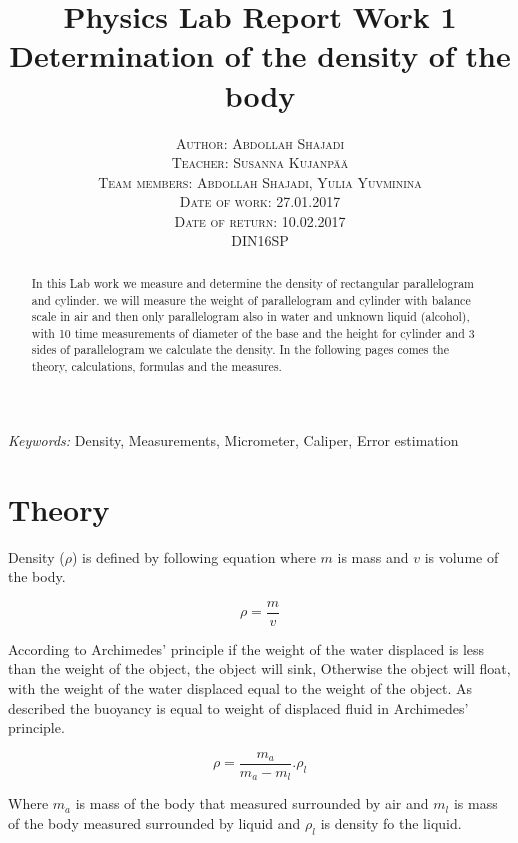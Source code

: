 \documentclass[a4paper, 12pt]{article}
\title{\textbf{Physics Lab Report Work 1}\\
	Determination of the density of the body}
\author{\textsc{Author: Abdollah Shajadi}
	\\{\textsc{Teacher: Susanna Kujanp{\"a}{\"a}}}
	\\{\textsc{Team members: Abdollah Shajadi, Yulia Yuvminina}}
	\\{\textsc{Date of work: 27.01.2017}}
	\\{\textsc{Date of return: 10.02.2017}}
	\\{\textsc{DIN16SP}}}
\makeatletter
\renewcommand{\maketitle}{ 
	\begin{flushright} 

		{\LARGE\@title} 
		
		\vspace{80pt} 
		
		{\large\@author} 
		
		\vspace{170pt} 
	\end{flushright}
}
\makeatother
\begin{document}
	
	\maketitle 
	
\clearpage

\tableofcontents

\clearpage

\renewcommand{\abstractname}{Summary} 

\begin{abstract}

In this Lab work we measure and determine the density of rectangular parallelogram and cylinder.
we will measure the weight of parallelogram and cylinder with balance scale in air and then only parallelogram also in water and unknown liquid (alcohol), with 10 time measurements of diameter of the base and the height for cylinder and 3 sides of parallelogram we calculate the density. 
In the following pages comes the theory, calculations, formulas and the measures.

\end{abstract}

\hspace*{3,6mm}\textit{Keywords:} Density, Measurements, Micrometer, Caliper, Error estimation 

\vspace{30pt}


\section{Theory}

Density (\(\rho\)) is defined by following equation where \(m\) is mass and \(v\) is volume of the body.

\[\rho = \dfrac{m}{v}\]

According to Archimedes' principle if the weight of the water displaced is less than the weight of the object, the object will sink, Otherwise the object will float, with the weight of the water displaced equal to the weight of the object. \cite{weber}
As described the buoyancy is equal to weight of displaced fluid in Archimedes' principle.

\[
\rho = \frac{m_{a}}{m_{a}-m_{l}}.\rho_{l}
\]

Where \(m_{a}\) is mass of the body that measured surrounded by air and \(m_{l}\) is mass of the body measured surrounded by liquid and \(\rho_{l}\) is density fo the liquid.
\end{document}
